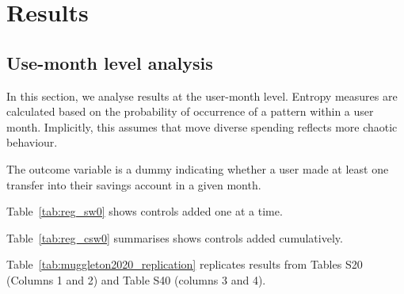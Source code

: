 
\section{Results}%
\label{sec:results}

\subsection{Use-month level analysis}%
\label{sub:use_month_level_analysis}

In this section, we analyse results at the user-month level. Entropy measures
are calculated based on the probability of occurrence of a pattern within a
user month. Implicitly, this assumes that move diverse spending reflects more
chaotic behaviour.

The outcome variable is a dummy indicating whether a user made at least one
transfer into their savings account in a given month.

Table~\ref{tab:reg_sw0} shows controls added one at a time.

\begin{landscape}
    
\end{landscape}

Table~\ref{tab:reg_csw0} summarises shows controls added cumulatively.

\begin{landscape}
    
\end{landscape}

Table~\ref{tab:muggleton2020_replication} replicates results from
\citet{muggleton2020evidence} Tables S20 (Columns 1 and 2) and Table S40
(columns 3 and 4).





